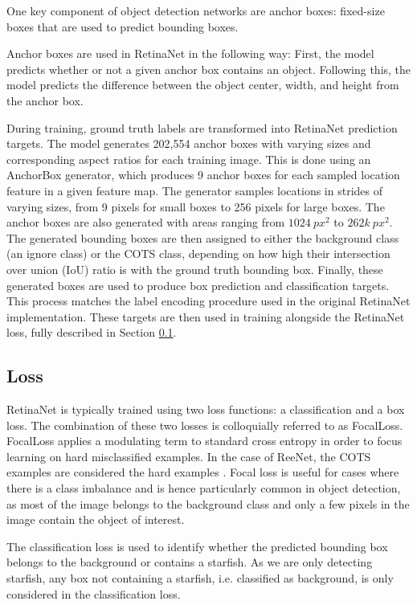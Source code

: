 \documentclass{article}
\begin{document}
One key component of object detection networks are anchor boxes: fixed-size boxes that are used to predict bounding boxes.

Anchor boxes are used in RetinaNet in the following way:
First, the model predicts whether or not a given anchor box contains an object. 
Following this, the model predicts the difference between the object center, width, and height from the anchor box.

During training, ground truth labels are transformed into RetinaNet prediction targets.
The model generates 202,554 anchor boxes with varying sizes and corresponding aspect ratios for each training image.
This is done using an AnchorBox generator, which produces 9 anchor boxes for each sampled location feature in a given feature map.
The generator samples locations in strides of varying sizes, from 9 pixels for small boxes to 256 pixels for large boxes.
The anchor boxes are also generated with areas ranging from $1024\: px^2$ to $262k\: px^2$.
The generated bounding boxes are then assigned to either the background class (an ignore class) or the COTS class, depending on how high their intersection over union (IoU) ratio is with the ground truth bounding box.
Finally, these generated boxes are used to produce box prediction and classification targets. 
This process matches the label encoding procedure used in the original RetinaNet implementation.
These targets are then used in training alongside the RetinaNet loss, fully described in Section \ref{sec:loss}.

\subsection{Loss}
\label{sec:loss}

RetinaNet is typically trained using two loss functions: a classification and a box loss.  The combination of these two losses is colloquially referred to as FocalLoss.  FocalLoss applies a modulating term to standard cross entropy in order to focus learning on hard misclassified examples.
In the case of ReeNet, the COTS examples are considered the hard examples .
Focal loss is useful for cases where there is a class imbalance and is hence particularly common in object detection, as most of the image belongs to the background class and only a few pixels in the image contain the object of interest.

The classification loss is used to identify whether the predicted bounding box belongs to the background or contains a starfish. As we are only detecting starfish, any box not containing a starfish, i.e. classified as background, is only considered in the classification loss.
\end{document}
